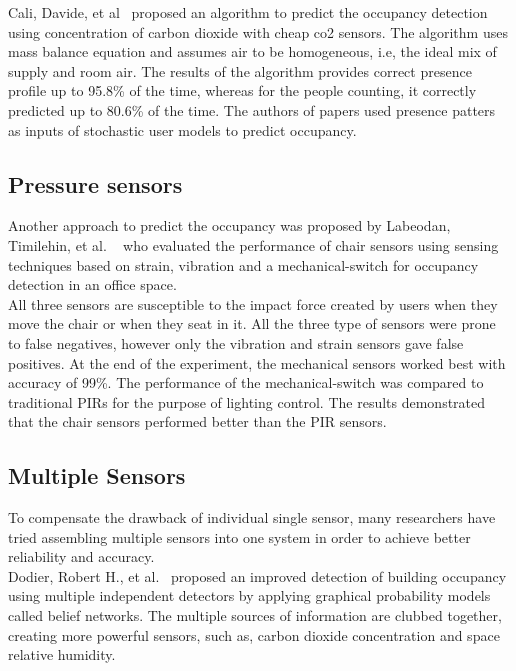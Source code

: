 Cali, Davide, et al~\cite{cali2015co2} proposed an algorithm to predict the occupancy detection using concentration of carbon dioxide with cheap co2 sensors. The algorithm uses mass balance equation and assumes air to be homogeneous, i.e, the ideal mix of supply and room air. The results of the algorithm provides correct presence profile up to 95.8\%  of the time, whereas for the people
counting, it correctly predicted up to 80.6\%  of the time. The authors of papers used presence patters as inputs of stochastic user models to predict occupancy. 


\subsection{Pressure sensors}
Another approach to predict the occupancy was proposed by Labeodan, Timilehin, et al. ~\cite{labeodan2016experimental} who evaluated the performance of chair sensors using sensing techniques based on strain, vibration and a mechanical-switch for occupancy detection in an office space.
\\
All three sensors are susceptible to the impact force created by users when they move the chair or when they seat in it. All the three type of sensors were prone to false negatives, however only the vibration and strain sensors gave false positives. At the end of the experiment, the mechanical sensors worked best with accuracy of 99\%. The performance of the mechanical-switch was compared to traditional PIRs for the purpose of lighting control. The results demonstrated that the chair sensors performed better than the PIR sensors.


\subsection{Multiple Sensors}

To compensate the drawback of individual single sensor, many researchers have tried assembling multiple sensors into one system in order to achieve better reliability and accuracy.
\\

Dodier, Robert H., et al.~\cite{dodier2006building} proposed an improved detection of building occupancy using multiple independent detectors by applying graphical probability models called belief networks. The multiple sources of information are clubbed together, creating more powerful sensors, such as, carbon dioxide concentration and space relative humidity.
\\



